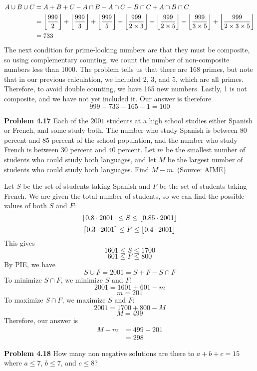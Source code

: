 \documentclass[11pt]{scrartcl}
\DeclarePairedDelimiter\ceil{\lceil}{\rceil}
\DeclarePairedDelimiter\floor{\lfloor}{\rfloor}
\begin{document}
\begin{align*}
    {A \cup B \cup C} &={A}+{B}+{C}-{A \cap B}-{A \cap C}-{B \cap C}+{A \cap B \cap C} \\
                      &=\floor*{\frac{999}{2}}+\floor*{\frac{999}{3}}+\floor*{\frac{999}{5}}-\floor*{\frac{999}{2 \times 3}}-\floor*{\frac{999}{2 \times 5}}-\floor*{\frac{999}{3 \times 5}}+\floor*{\frac{999}{2 \times 3 \times 5}} \\
                      &= 733
\end{align*}
The next condition for prime-looking numbers are that they must be composite, so using complementary counting, we count the number of non-composite numbers less than 1000. The problem tells us that there are 168 primes, but note that in our previous calculation, we included 2, 3, and 5, which are all primes. Therefore, to avoid double counting, we have 165 new numbers. Lastly, 1 is not composite, and we have not yet included it. Our answer is therefore 
$$999-733-165-1=100$$
\begin{tcolorbox}
\textbf{Problem 4.17} Each of the $2001$ students at a high school studies either Spanish or French, and some study both. The number who study Spanish is between $80$ percent and $85$ percent of the school population, and the number who study French is between $30$ percent and $40$ percent. Let $m$ be the smallest number of students who could study both languages, and let $M$ be the largest number of students who could study both languages. Find $M-m$. (Source: AIME)
\end{tcolorbox}
\noindent
Let $S$ be the set of students taking Spanish and $F$ be the set of students taking French. We are given the total number of students, so we can find the possible values of both $S$ and $F$: 
$$\ceil*{0.8 \cdot 2001}\leq S \leq \floor*{0.85 \cdot 2001}$$
$$\ceil*{0.3 \cdot 2001}\leq F \leq \floor*{0.4 \cdot 2001}$$
This gives 
$$1601 \leq S \leq 1700$$
$$601 \leq F \leq 800$$
By PIE, we have 
$${S \cup F}=2001={S}+{F}-{S \cap F}$$
To minimize ${S \cap F}$, we minimize $S$ and $F$:
$$2001=1601+601-m$$
$$m=201$$
To maximize ${S \cap F}$, we maximize $S$ and $F$:
$$2001=1700+800-M$$
$$M=499$$
Therefore, our answer is 
\begin{align*}
    M-m &=499-201 \\
        &=298
\end{align*}
\noindent 
\begin{tcolorbox}
\textbf{Problem 4.18} How many non negative solutions are there to $a+b+c=15$ where $a \leq 7$, $b \leq 7$, and $c \leq 8$?
\end{tcolorbox}
\end{document}
